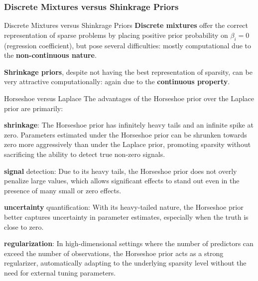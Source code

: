 \subsubsection{Discrete Mixtures versus Shinkrage Priors}
\begin{frame}{Discrete Mixtures versus Shinkrage Priors}
    \textbf{Discrete mixtures} offer the correct representation of sparse problems
    \parencite{carvalho2009handling} by placing positive prior probability on
    $\beta_i = 0$ (regression coefficient),
    but pose several difficulties: mostly computational due to the
    \textbf{non-continuous nature}.

    \textbf{Shrinkage priors}, despite not having the best representation of sparsity,
    can be very attractive computationally: again due to the \textbf{continuous property}.
\end{frame}

\begin{frame}{Horseshoe versus Laplace}
    The advantages of the Horseshoe prior over the Laplace prior are primarily:

    \begin{vfilleditems}
        \small
        \item \textbf{shrinkage}:
            The Horseshoe prior has infinitely heavy tails and an infinite spike at zero.
            Parameters estimated under the Horseshoe prior can be shrunken towards zero
            more aggressively than under the Laplace prior,
            promoting sparsity without sacrificing the ability to detect true non-zero signals.
        \item \textbf{signal} detection:
            Due to its heavy tails,
            the Horseshoe prior does not overly penalize large values,
            which allows significant effects to stand out even in the presence
            of many small or zero effects.
        \item \textbf{uncertainty} quantification:
            With its heavy-tailed nature,
            the Horseshoe prior better captures uncertainty in parameter estimates,
            especially when the truth is close to zero.
        \item \textbf{regularization}: In high-dimensional settings where the number of
            predictors can exceed the number of observations,
            the Horseshoe prior acts as a strong regularizer,
            automatically adapting to the underlying sparsity level without the
            need for external tuning parameters.
    \end{vfilleditems}
\end{frame}

